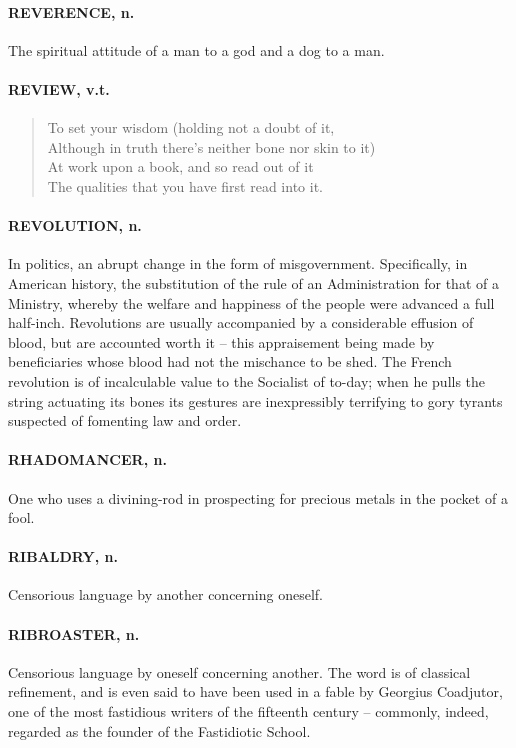 \documentclass[11pt]{article}
\begin{document}
\paragraph{REVERENCE, n.}  The spiritual attitude of a man to a god and a dog to a
man.

\paragraph{REVIEW, v.t.}

\begin{quote}   To set your wisdom (holding not a doubt of it, \\
      Although in truth there's neither bone nor skin to it) \\
  At work upon a book, and so read out of it \\
      The qualities that you have first read into it.
\end{quote}
\paragraph{REVOLUTION, n.}  In politics, an abrupt change in the form of
misgovernment.  Specifically, in American history, the substitution of
the rule of an Administration for that of a Ministry, whereby the
welfare and happiness of the people were advanced a full half-inch.
Revolutions are usually accompanied by a considerable effusion of
blood, but are accounted worth it -- this appraisement being made by
beneficiaries whose blood had not the mischance to be shed.  The
French revolution is of incalculable value to the Socialist of to-day;
when he pulls the string actuating its bones its gestures are
inexpressibly terrifying to gory tyrants suspected of fomenting law
and order.

\paragraph{RHADOMANCER, n.}  One who uses a divining-rod in prospecting for
precious metals in the pocket of a fool.

\paragraph{RIBALDRY, n.}  Censorious language by another concerning oneself.

\paragraph{RIBROASTER, n.}  Censorious language by oneself concerning another.
The word is of classical refinement, and is even said to have been
used in a fable by Georgius Coadjutor, one of the most fastidious
writers of the fifteenth century -- commonly, indeed, regarded as the
founder of the Fastidiotic School.
\end{document}
